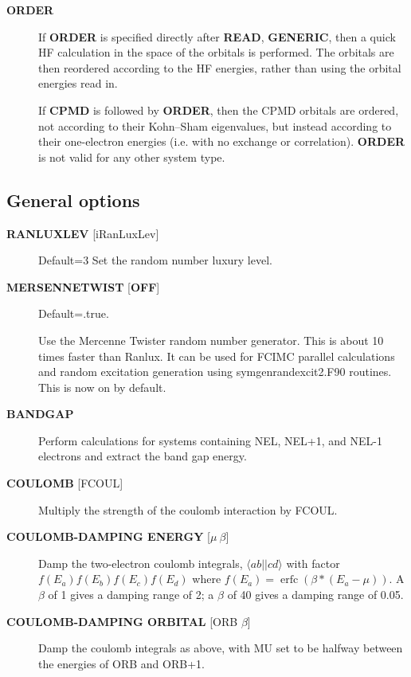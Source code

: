 \documentclass[openany,a4paper,10pt]{manual}
\newcommand{\bra}{\ensuremath{\langle}}
\newcommand{\ket}{\ensuremath{\rangle}}
\begin{document}
\begin{description}
\item[\textbf{ORDER}]
If \textbf{ORDER} is specified directly after \textbf{READ}, \textbf{GENERIC},
then a quick HF calculation in the space of the orbitals is performed.
The orbitals are then reordered according to the HF energies,
rather than using the orbital energies read in.

If \textbf{CPMD} is followed by \textbf{ORDER}, then the CPMD orbitals are
ordered, not according to their Kohn--Sham eigenvalues, but instead
according to their one-electron energies (i.e. with no exchange or
correlation).  \textbf{ORDER} is not valid for any other system type.

\end{description}


\subsection{General options}
\begin{description}
\item[\textbf{RANLUXLEV} {[}iRanLuxLev{]}]
Default=3
Set the random number luxury level.

\item[\textbf{MERSENNETWIST} {[}\textbf{OFF}{]}]
Default=.true.

Use the Mercenne Twister random number generator. This is about 10 times
faster than Ranlux. It can be used for FCIMC parallel calculations and random
excitation generation using symgenrandexcit2.F90 routines. This is now on
by default.

\item[\textbf{BANDGAP}]
Perform calculations for systems containing NEL, NEL+1, and NEL-1
electrons and extract the band gap energy.

\item[\textbf{COULOMB} {[}FCOUL{]}]
Multiply the strength of the coulomb interaction by FCOUL.

\item[\textbf{COULOMB-DAMPING ENERGY} {[}$\mu\ \beta${]}]
Damp the two-electron coulomb integrals, $\bra ab ||
c d\ket$ with factor $f(E_a)f(E_b)f(E_c)f(E_d)$ where
$f(E_a)=\operatorname{erfc}(\beta*(E_a-\mu))$.  A $\beta$
of 1 gives a damping range of 2; a $\beta$ of 40 gives a damping
range of 0.05.

\item[\textbf{COULOMB-DAMPING ORBITAL} {[}ORB $\beta${]}]
Damp the coulomb integrals as above, with MU set to be halfway between
the energies of ORB and ORB+1.

\end{description}
\end{document}
